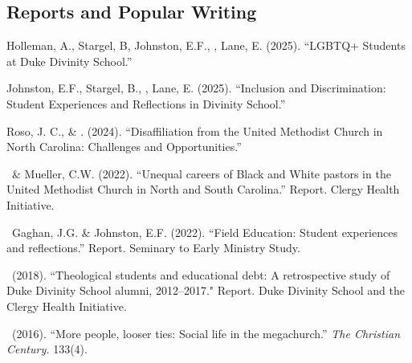 \subsection*{Reports and Popular Writing}
\begin{etaremune} 
\item Holleman, A., Stargel, B, Johnston, E.F., \Eagle, Lane, E. (2025). ``LGBTQ+ Students at Duke Divinity School.''

\item Johnston, E.F., Stargel, B., \Eagle, Lane, E. (2025). ``Inclusion and Discrimination: Student Experiences and Reflections in Divinity School.''

\item Roso, J. C., \& \Eagle. (2024). ``Disaffiliation from the United Methodist Church in North Carolina: Challenges and Opportunities.'' 

\item \Eagle\, \& Mueller, C.W. (2022). ``Unequal careers of Black and White pastors in the United Methodist Church in North and South Carolina.'' Report. Clergy Health Initiative.

\item \Eagle\, Gaghan, J.G. \& Johnston, E.F. (2022). ``Field Education: Student experiences and reflections.'' Report. Seminary to Early Ministry Study.

\item \Eagle\ (2018). ``Theological students and educational debt: A retrospective study of Duke Divinity School alumni, 2012--2017." Report. Duke Divinity School and the Clergy Health Initiative.

\item \Eagle\ (2016). ``More people, looser ties: Social life in the megachurch.'' \textit{The Christian Century.} 133(4).
\end{etaremune}